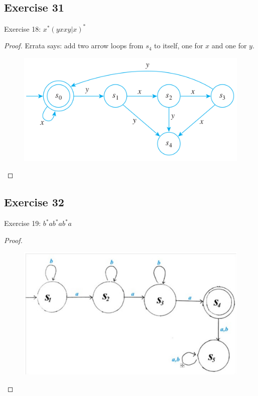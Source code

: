 \documentclass[14pt]{extarticle}
\begin{document}
\subsection{Exercise 31}
Exercise 18: \(x^*(yxxy | x)^*\)
\begin{proof}
Errata says: add two arrow loops from \(s_4\) to itself, one for \(x\) and one for \(y\).

\begin{figure}[ht!]
\centering
\includegraphics[scale=0.5]{../images/12.2.31.png}
\end{figure}
\end{proof}

\subsection{Exercise 32}
Exercise 19: \(b^*ab^*ab^*a\)
\begin{proof}
\begin{figure}[ht!]
\centering
\includegraphics[scale=0.2]{../images/12.2.32.png}
\end{figure}
\end{proof}
\end{document}
